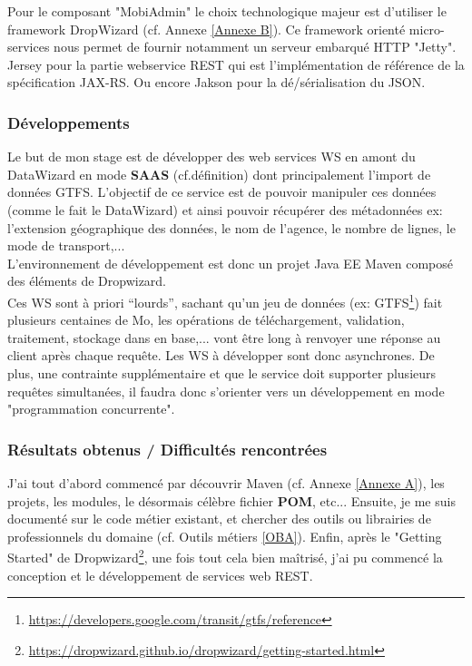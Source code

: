 \begin{itemize}
Pour le composant "MobiAdmin" le choix technologique majeur est d'utiliser le framework DropWizard (cf. Annexe \ref{Annexe B}). Ce framework orienté micro-services nous permet de fournir notamment un serveur embarqué HTTP "Jetty". Jersey pour la partie webservice REST qui est l'implémentation de référence de la spécification JAX-RS. Ou encore Jakson pour la dé/sérialisation du JSON.\\


\subsubsection{Développements}

Le but de mon stage est de développer des web services WS en amont du DataWizard en mode \textbf{SAAS} (cf.définition) dont principalement l'import de données GTFS. L'objectif de ce service est de pouvoir manipuler ces données (comme le fait le DataWizard) et ainsi pouvoir récupérer des métadonnées ex: l'extension géographique des données, le nom de l'agence, le nombre de lignes, le mode de transport,...\\

L'environnement de développement est donc un projet Java EE Maven composé des éléments de Dropwizard. \\
Ces WS sont à priori “lourds”, sachant qu'un jeu de données (ex: GTFS\footnote{\url{https://developers.google.com/transit/gtfs/reference}}) fait plusieurs centaines de Mo, les opérations de téléchargement, validation, traitement, stockage dans en base,... vont être long à renvoyer une réponse au client après chaque requête. Les WS à développer sont donc asynchrones. De plus, une contrainte supplémentaire et que le service doit supporter plusieurs requêtes simultanées, il faudra donc s'orienter vers un développement en mode "programmation concurrente".\\


\subsubsection{Résultats obtenus / Difficultés rencontrées}

J'ai tout d'abord commencé par découvrir Maven (cf. Annexe \ref{Annexe A}), les projets, les modules, le désormais célèbre fichier \textbf{POM}, etc...
Ensuite, je me suis documenté sur le code métier existant, et chercher des outils ou librairies de professionnels du domaine (cf. Outils métiers \ref{OBA}).
Enfin, après le "Getting Started" de Dropwizard\footnote{\url{https://dropwizard.github.io/dropwizard/getting-started.html}}, une fois tout cela bien maîtrisé, j'ai pu  commencé la conception et le développement de services web REST.\\


\end{itemize}
